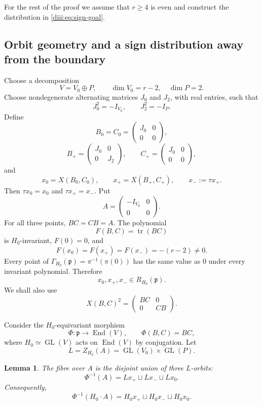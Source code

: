 \documentclass[11pt,reqno]{amsart}
\numberwithin{equation}{section}
\newtheorem{lemma}[theorem]{Lemma}
\theoremstyle{definition}
\theoremstyle{remark}
\newcommand{\GL}{\operatorname{GL}}
\newcommand{\End}{\operatorname{End}}
\newcommand{\tr}{\operatorname{tr}}
\newcommand{\fp}{\mathfrak p}
\begin{document}
For the rest of the proof we assume that $r\ge4$ is even and construct the distribution in \eqref{diii:eq:sign-goal}.

\subsection{Orbit geometry and a sign distribution away from the boundary}

Choose a decomposition
\[
  V=V_0\oplus P,
  \qquad \dim V_0=r-2,\quad \dim P=2.
\]
Choose nondegenerate alternating matrices $J_0$ and $J_2$, with real entries, such that
\[
  J_0^2=-I_{V_0},\qquad J_2^2=-I_P.
\]
Define
\[
 B_0=C_0=\begin{pmatrix}J_0&0\\0&0\end{pmatrix},
\]
\[
 B_+=\begin{pmatrix}J_0&0\\0&J_2\end{pmatrix},
 \qquad
 C_+=\begin{pmatrix}J_0&0\\0&0\end{pmatrix},
\]
and
\[
  x_0=X(B_0,C_0),\qquad
  x_+=X(B_+,C_+),\qquad
  x_-:=\tau x_+.
\]
Then $\tau x_0=x_0$ and $\tau x_+=x_-$.  Put
\[
  A=\begin{pmatrix}-I_{V_0}&0\\0&0\end{pmatrix}.
\]
For all three points, $BC=CB=A$.  The polynomial
\[
  F(B,C)=\tr(BC)
\]
is $H_0$-invariant, $F(0)=0$, and
\[
  F(x_0)=F(x_+)=F(x_-)=-(r-2)\ne0.
\]
Every point of $\Gamma_{H_0}(\fp)=\pi^{-1}(\pi(0))$ has the same value as $0$ under every invariant polynomial.  Therefore
\begin{equation}\label{diii:eq:pointsR}
  x_0,x_+,x_-\in R_{H_0}(\fp).
\end{equation}
We shall also use
\begin{equation}\label{diii:eq:square}
  X(B,C)^2=\begin{pmatrix}BC&0\\0&CB\end{pmatrix}.
\end{equation}

Consider the $H_0$-equivariant morphism
\[
  \Phi:\fp\to\End(V),\qquad \Phi(B,C)=BC,
\]
where $H_0\simeq\GL(V)$ acts on $\End(V)$ by conjugation.  Let
\[
  L=Z_{H_0}(A)=\GL(V_0)\times\GL(P).
\]

\begin{lemma}\label{diii:lem:fiber}
The fibre over $A$ is the disjoint union of three $L$-orbits:
\[
  \Phi^{-1}(A)=Lx_+\sqcup Lx_-\sqcup Lx_0.
\]
Consequently,
\begin{equation}\label{diii:eq:preimage-conjclass}
  \Phi^{-1}(H_0\cdot A)
  =H_0x_+\sqcup H_0x_-\sqcup H_0x_0.
\end{equation}
\end{lemma}
\end{document}
